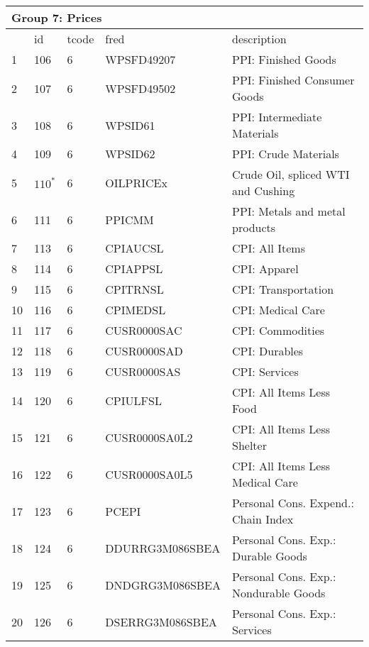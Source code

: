 \begin{table}[ht] 
\centering 
\begin{tabular}{lllll}
\multicolumn{5}{l}{Group 7: Prices} \\
\toprule
 & id & tcode & fred & description \\
\midrule
1 & 106 & 6 & WPSFD49207 & PPI: Finished Goods \\
2 & 107 & 6 & WPSFD49502 & PPI: Finished Consumer Goods \\
3 & 108 & 6 & WPSID61 & PPI: Intermediate Materials \\
4 & 109 & 6 & WPSID62 & PPI: Crude Materials \\
5 & $110^*$ & 6 & OILPRICEx & Crude Oil, spliced WTI and Cushing \\
6 & 111 & 6 & PPICMM & PPI: Metals and metal products \\
7 & 113 & 6 & CPIAUCSL & CPI: All Items \\
8 & 114 & 6 & CPIAPPSL & CPI: Apparel \\
9 & 115 & 6 & CPITRNSL & CPI: Transportation \\
10 & 116 & 6 & CPIMEDSL & CPI: Medical Care \\
11 & 117 & 6 & CUSR0000SAC & CPI: Commodities \\
12 & 118 & 6 & CUSR0000SAD & CPI: Durables \\
13 & 119 & 6 & CUSR0000SAS & CPI: Services \\
14 & 120 & 6 & CPIULFSL & CPI: All Items Less Food \\
15 & 121 & 6 & CUSR0000SA0L2 & CPI: All Items Less Shelter \\
16 & 122 & 6 & CUSR0000SA0L5 & CPI: All Items Less Medical Care \\
17 & 123 & 6 & PCEPI & Personal Cons. Expend.: Chain Index \\
18 & 124 & 6 & DDURRG3M086SBEA & Personal Cons. Exp.: Durable Goods \\
19 & 125 & 6 & DNDGRG3M086SBEA & Personal Cons. Exp.: Nondurable Goods \\
20 & 126 & 6 & DSERRG3M086SBEA & Personal Cons. Exp.: Services \\
\bottomrule
\end{tabular}  
\end{table} 